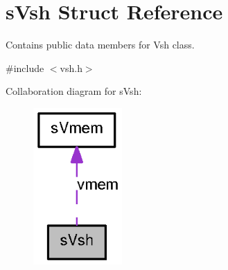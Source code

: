 \section{sVsh Struct Reference}
\label{a00007}


Contains public data members for Vsh class.  




{\ttfamily \#include $<$vsh.h$>$}



Collaboration diagram for sVsh:
\nopagebreak
\begin{figure}[H]
\begin{center}
\leavevmode
\includegraphics[width=96pt]{a00064}
\end{center}
\end{figure}
